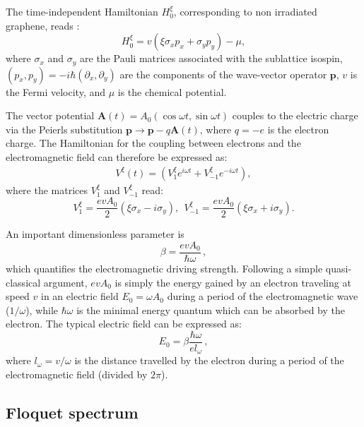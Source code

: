 \documentclass[aps,prb,showpacs,superscriptaddress,twocolumn,10pt,floatfix]{revtex4-1}
\begin{document}
The time-independent Hamiltonian $H_0^\xi$, corresponding to non irradiated graphene, reads\cite{Geim2009,Goerbig2011} : 
\begin{equation}
H_0^\xi = v (\xi\sigma_x p_x + \sigma_y p_y)- \mu ,
\label{eq:non_irrad_Hamiltonian}
\end{equation}
where $\sigma_x$ and $\sigma_y$ are the Pauli matrices associated with the sublattice isospin, $(p_x,p_y)=-i\hbar (\partial_x ,\partial_y )$ are the components of the wave-vector operator $\mathbf{p}$, $v$ is the Fermi velocity, and $\mu$ is the chemical potential. 

The vector potential $\mathbf{A}(t)=A_0(\cos\omega t,\sin\omega t)$ couples to the electric charge via the Peierls substitution $\mathbf{p}\rightarrow\mathbf{p}-q\mathbf{A}(t)$, where $q=-e$ is the electron charge. The Hamiltonian for the coupling between electrons and the electromagnetic field can therefore be expressed as:
\begin{align}
V^\xi (t)=(V_{1}^\xi  e^{i \omega t} + V_{-1}^\xi  e^{ -i \omega t}),
\label{potential}
\end{align}
where the matrices $V_1^\xi $ and $V_{-1}^\xi $ read:
\begin{equation}
V_{1}^\xi=\frac{evA_0}{2}(\xi\sigma_x - i\sigma_y), \ \ V_{-1}^\xi=\frac{evA_0}{2}(\xi\sigma_x + i\sigma_y).
\label{V1}
\end{equation}

An important dimensionless parameter is 
\begin{equation}
\beta=\frac{evA_0}{\hbar\omega} \, ,
\label{eq:beta} 
\end{equation}
which quantifies the electromagnetic driving strength. Following a simple quasi-classical argument, $evA_0$ is simply the energy gained by an electron traveling at speed $v$ in an electric field $E_0 = \omega A_0$ during a period of the electromagnetic wave ($1/\omega$), while $\hbar \omega$ is the minimal energy quantum which can be absorbed by the electron. The typical electric field can be expressed as:
\begin{equation}
E_0 = \beta \frac{\hbar\omega}{e l_\omega} \, ,
\label{eq:electric_field} 
\end{equation}
where $l_\omega = v / \omega$ is the distance travelled by the electron during a period of the electromagnetic field (divided by $2 \pi$).

\subsection{Floquet spectrum}
\end{document}
